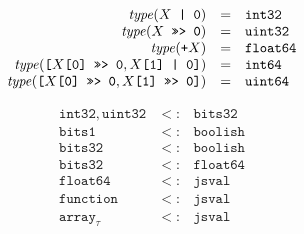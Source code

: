 \documentclass{article}
\newcommand{\type}{\mathit{type}}
\newcommand{\mathjs}[1]{\mbox{\texttt{{#1}}}}
\newcommand{\boolean}{\mathtt{bits1}}
\newcommand{\uintone}{\mathtt{uint8}}
\newcommand{\uinttwo}{\mathtt{uint16}}
\newcommand{\uintfour}{\mathtt{uint32}}
\newcommand{\uinteight}{\mathtt{uint64}}
\newcommand{\intone}{\mathtt{int8}}
\newcommand{\inttwo}{\mathtt{int16}}
\newcommand{\intfour}{\mathtt{int32}}
\newcommand{\inteight}{\mathtt{int64}}
\newcommand{\float}{\mathtt{float32}}
\newcommand{\double}{\mathtt{float64}}
\newcommand{\arr}[1]{\mathtt{array}_{#1}}
\newcommand{\any}{\mathtt{jsval}}
\newcommand{\str}{\mathtt{string}}
\newcommand{\undef}{\mathtt{undefined}}
\newcommand{\nul}{\mathtt{null}}
\newcommand{\num}{\mathtt{number}}
\newcommand{\obj}{\mathtt{object}}
\newcommand{\getprop}[2]{{#1}\mathjs{[}{#2}\mathjs{]}}
\newcommand{\longlong}[2]{\mathjs{[}{#1},{#2}\mathjs{]}}
\newcommand{\toint}[1]{{#1}\mathjs{ | 0}}
\newcommand{\touint}[1]{{#1}\mathjs{ >>> 0}}
\newcommand{\word}{\mathtt{bits32}}
\newcommand{\function}{\mathtt{function}}
\newcommand{\union}[2]{{#1}\mathrel{|}{#2}}
\newcommand{\boolish}{\mathtt{boolish}}
\begin{document}
\[
\begin{array}{rcl}
\type(\toint{X}) & = & \intfour \\
\type(\touint{X}) & = & \uintfour \\
\type(\mathjs{+}X) & = & \double \\
\type(\longlong{\touint{\getprop{X}{\mathjs{0}}}}{\toint{\getprop{X}{\mathjs{1}}}}) & = & \inteight \\
\type(\longlong{\touint{\getprop{X}{\mathjs{0}}}}{\touint{\getprop{X}{\mathjs{1}}}}) & = & \uinteight \\
\end{array}
\]


\[
\begin{array}{rcl}
\intfour, \uintfour & <: & \word \\
\boolean            & <: & \boolish \\
\word               & <: & \boolish \\
\word               & <: & \double \\
\double             & <: & \any \\
\function           & <: & \any \\
\arr{\tau}          & <: & \any \\
\end{array}
\]
\end{document}
